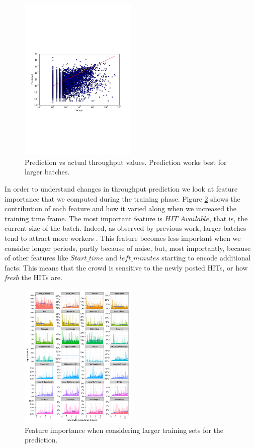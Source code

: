 \begin{figure}[tb]
	\centering
		\includegraphics[width=0.5\textwidth]{figures/predictions_3}
	\caption{Prediction vs actual throughput values. Prediction works best for larger batches.}
	\label{fig:pred}
\end{figure}

In order to understand  changes in throughput prediction we  look at  feature importance that we computed during   the training phase. Figure \ref{fig:importances} shows the  contribution of each feature and how it varied along when we increased the training time frame.
The most important feature is $HIT\_Available$, that is, the current size of the batch. Indeed, as observed by previous work, larger batches tend to attract more workers . This feature becomes less important when we consider longer periods, partly because of  noise, but, most importantly, because of other features like $Start\_time$ and $left\_minutes$ starting to encode additional facts: This means that the crowd is sensitive to the newly posted HITs, or how \emph{fresh} the HITs are.

\begin{figure}[tb]
	\centering
		\includegraphics[width=0.5\textwidth]{figures/importances}
	\caption{Feature importance when considering larger training sets for the prediction.}
	\label{fig:importances}
\end{figure}
